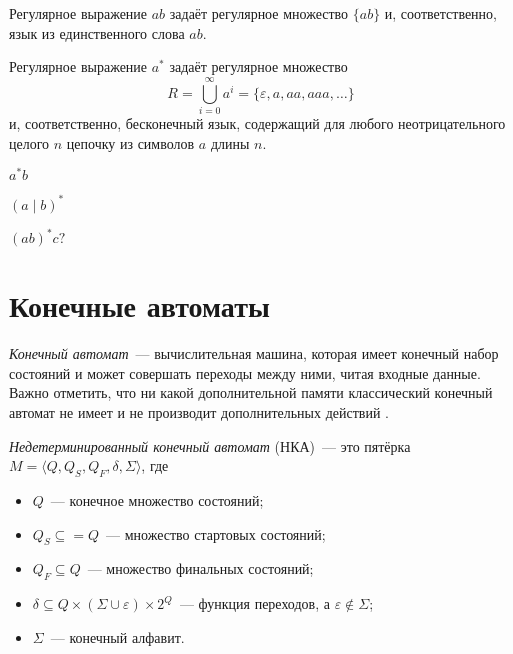 \begin{example}
    Регулярное выражение $ab$ задаёт регулярное множество $\{ab\}$ и, соответственно, язык из единственного слова $ab$.
\end{example}


\begin{example}
    Регулярное выражение $a^*$ задаёт регулярное множество $$R = \bigcup_{i=0}^{\infty}{a^i} = \{\varepsilon, a, aa, aaa, \ldots \}$$ и, соответственно, бесконечный язык, содержащий для любого неотрицательного целого $n$ цепочку из символов $a$ длины $n$.
\end{example}

\begin{example}
    $a^*b$
\end{example}

\begin{example}
    $(a\mid b)^*$
\end{example}

\begin{example}
    $(ab)^*c?$
\end{example}

\section{Конечные автоматы}

\emph{Конечный автомат}~--- вычислительная машина, которая имеет конечный набор состояний и может совершать переходы между ними, читая входные данные.
Важно отметить, что ни какой дополнительной памяти классический конечный автомат не имеет%
 и не производит дополнительных действий%
.

\begin{definition}
    \label{def:NondeterminicticFiniteAutomata}
    \emph{Недетерминированный конечный автомат} (НКА)~--- это пятёрка $M = \langle Q, Q_S, Q_F, \delta, \Sigma \rangle$, где
    \begin{itemize}
        \item $Q$~--- конечное множество состояний;
        \item $Q_S \subseteq= Q$~--- множество стартовых состояний;
        \item $Q_F \subseteq Q$~--- множество финальных состояний;
        \item $\delta \subseteq Q \times (\Sigma \cup \varepsilon) \times 2^Q$~--- функция переходов, а $\varepsilon \notin \Sigma$;
        \item $\Sigma$~--- конечный алфавит.
    \end{itemize}
\end{definition}

